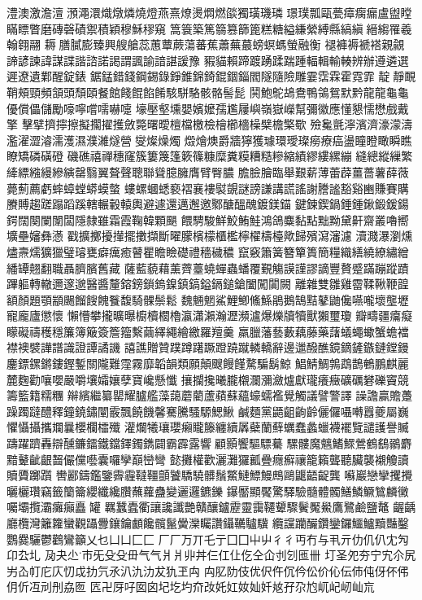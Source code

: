 澧澳激澹澶澦澠澴熾燉燐燒燈燕熹燎燙燜燃燄獨璜璣璘
璟璞瓢甌甍瘴瘸瘺盧盥瞠瞞瞟瞥磨磚磬磧禦積穎穆穌穋窺
篙簑築篤篛篡篩篦糕糖縊縑縈縛縣縞縝縉縐罹羲翰翱翮
耨膳膩膨臻興艘艙蕊蕙蕈蕨蕩蕃蕉蕭蕪蕞螃螟螞螢融衡
褪褲褥褫褡親覦諦諺諫諱謀諜諧諮諾謁謂諷諭諳諶諼豫
豭貓賴蹄踱踴蹂踹踵輻輯輸輳辨辦遵遴選遲遼遺鄴醒錠錶
鋸錳錯錢鋼錫錄錚錐錦錡錕錮錙閻隧隨險雕霎霑霖霍霓霏
靛靜靦鞘頰頸頻頷頭頹頤餐館餞餛餡餚駭駢駱骸骼髻髭
鬨鮑鴕鴣鴦鴨鴒鴛默黔龍⿓龜⿔優償儡儲勵嚎嚀嚐嚅嚇嚏
壕壓壑壎嬰嬪嬤孺尷屨嶼嶺嶽嶸幫彌徽應懂懇懦懋戲戴擎
擊擘擠擰擦擬擱擢擭斂斃曙曖檀檔檄檢檜櫛檣橾檗檐檠歜
殮毚氈濘濱濟濠濛濤濫濯澀濬濡濩濕濮濰燧營燮燦燥燭
燬燴燠爵牆獰獲璩環璦璨癆療癌盪瞳瞪瞰瞬瞧瞭矯磷磺磴
磯礁禧禪穗窿簇簍篾篷簌篠糠糜糞糢糟糙糝縮績繆縷縲繃
縫總縱繅繁縴縹繈縵縿縯罄翳翼聱聲聰聯聳臆臃膺臂臀膿
膽臉膾臨舉艱薪薄蕾薜薑薔薯薛薇薨薊薦虧蟀蟑螳蟒蟆螫
螻螺蟈蟋褻褶襄褸褽覬謎謗謙講謊謠謝謄謐豁谿豳賺賽購
賸賻趨蹉蹋蹈蹊轄輾轂轅輿避遽還邁邂邀鄹醣醞醜鍍鎂錨
鍵鍊鍥鍋錘鍾鍬鍛鍰鍚鍔闊闋闌闈闆隱隸雖霜霞鞠韓顆颶
餵騁駿鮮鮫鮪鮭鴻鴿麋黏點黜黝黛鼾齋叢嚕嚮壙壘嬸彝懣
戳擴擲擾攆擺擻擷斷曜朦檳檬櫃檻檸櫂檮檯歟歸殯瀉瀋濾
瀆濺瀑瀏燻燼燾燸獷獵璧璿甕癖癘癒瞽瞿瞻瞼礎禮穡穢穠
竄竅簫簧簪簞簣簡糧織繕繞繚繡繒繙罈翹翻職聶臍臏舊藏
薩藍藐藉薰薺薹蟯蟬蟲蟠覆覲觴謨謹謬謫豐贅蹙蹣蹦蹤蹟
蹕軀轉轍邇邃邈醫醬釐鎔鎊鎖鎢鎳鎮鎬鎰鎘鎚鎗闔闖闐闕
離雜雙雛雞霤鞣鞦鞭韹額顏題顎顓颺餾餿餽餮馥騎髁鬃鬆
魏魎魍鯊鯉鯽鯈鯀鵑鵝鵠黠鼕鼬儳嚥嚨壞壟壢寵龐廬懲懷
懶懵攀攏曠曝櫥櫝櫚櫓瀛瀟瀨瀚瀝瀕瀘爆爍牘犢獸獺璽瓊
瓣疇疆癟癡矇礙禱穫穩簾簿簸簽簷籀繫繭繹繩繪繳羅羶羹
羸臘藩藝藪藕藤藥藷蟻蠅蠍蟹蟾襠襟襖襞譁譜識證譚譎譏
譆譙贈贊蹼蹲躇蹶蹬蹺蹴轔轎辭邊邋醱醮鏡鏑鏟鏃鏈鏜鏝
鏖鏢鏍鏘鏤鏗鏨關隴難霪霧靡韜韻類願顛颼饅饉騖騙鬍鯨
鯧鯖鯛鶉鵡鵲鵪鵬麒麗麓麴勸嚷嚶嚴嚼壤孀孃孽寶巉懸懺
攘攔攙曦朧櫬瀾瀰瀲爐獻瓏癢癥礦礪礬礫竇競籌籃籍糯糰
辮繽繼纂罌耀臚艦藻藹蘑藺蘆蘋蘇蘊蠔蠕襤覺觸議譬警譯
譟譫贏贍躉躁躅躂醴釋鐘鐃鏽闡霰飄饒饑馨騫騰騷騵鰓鰍
鹹麵黨鼯齟齣齡儷儸囁囀囂夔屬巍懼懾攝攜斕曩櫻欄櫺殲
灌爛犧瓖瓔癩矓籐纏續羼蘗蘭蘚蠣蠢蠡蠟襪襬覽譴護譽贓
躊躍躋轟辯醺鐮鐳鐵鐺鐸鐲鐫闢霸霹露響顧顥饗驅驃驀
騾髏魔魑鰭鰥鶯鶴鷂鶸麝黯鼙齜齦齧儼儻囈囊囉孿巔巒彎
懿攤權歡灑灘玀瓤疊癮癬禳籠籟聾聽臟襲襯觼讀贖贗躑躓
轡酈鑄鑑鑒霽霾韃韁顫饕驕驍髒鬚鱉鰱鰾鰻鷓鷗鼴齬齪龔
囌巖戀攣攫攪曬欐瓚竊籤籣籥纓纖纔臢蘸蘿蠱變邐邏鑣鑠
鑤靨顯饜驚驛驗髓體髑鱔鱗鱖鷥麟黴囑壩攬灞癱癲矗罐
羈蠶蠹衢讓讒讖艷贛釀鑪靂靈靄韆顰驟鬢魘鱟鷹鷺鹼鹽鼇
齷齲廳欖灣籬籮蠻觀躡釁鑲鑰顱饞髖鬣黌灤矚讚鑷韉驢驥
纜讜躪釅鑽鑾鑼鱷鱸黷豔鑿鸚爨驪鬱鸛鸞籲乂乜⼐凵⼕匚
⼚厂万丌乇亍⼞囗⼬屮⼻彳丏冇与丮亓仂仉仈冘勼卬厹圠
夃夬尐巿旡⽎殳毌⽓气⽙爿丱丼仨仜仩仡仝仚刌刉匜卌
圢圣夗夯宁宄尒尻屴屳帄庀庂忉戉扐氕氶汃氿氻犮犰玊⽱
禸肊阞伎优伬仵伔仱伀价伈伝伂伅伢伓伄仴伒冱刓刐劦匢
匟卍厊吇囡囟圮圪圴夼妀奼妅奻奾奷奿孖尕尥屼屺屻屾巟
